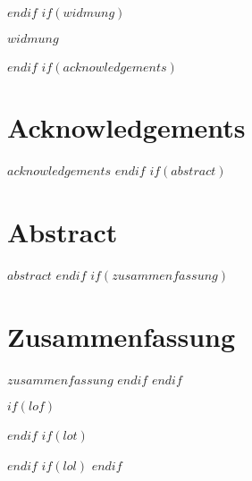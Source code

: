 $endif$
$if(widmung)$
\cleardoublepage
{
\vspace*{6cm}
\begin{center}
\calligra \large $widmung$
\end{center}
}
$endif$
$if(acknowledgements)$
\clearpage
\chapter{Acknowledgements}
$acknowledgements$
$endif$
$if(abstract)$
\clearpage
\chapter{Abstract}
$abstract$
$endif$
$if(zusammenfassung)$
\clearpage
\chapter{Zusammenfassung}
$zusammenfassung$
$endif$
$endif$

$if(lof)$
\clearpage
\listoffigures
$endif$
$if(lot)$
\clearpage
\listoftables
$endif$
$if(lol)$
\clearpage
\listoflistings
$endif$